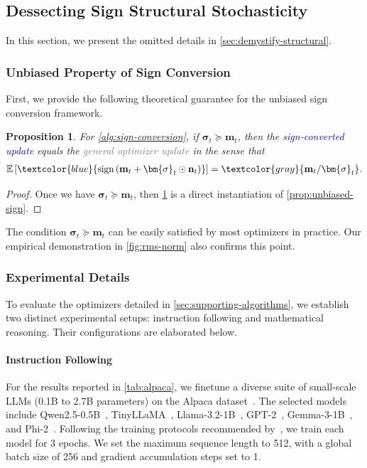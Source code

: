 \documentclass{article}
\newtheorem{prop}{Proposition}
\def \E {\mathbb{E}}
\def \m {\mathbf{m}}
\def \n {\mathbf{n}}
\DeclareMathOperator*{\sgn}{sign}
\newcommand{\sign}[1]{\sgn\left(#1\right)}
\def \bsigma {\bm{\sigma}}
\newcommand{\sqbrac}[1]{\left[#1\right]}
\begin{document}
\subsection{Dessecting Sign Structural Stochasticity\label{sec:dessect-sign-noise}}

In this section, we present the omitted details in \cref{sec:demystify-structural}. 

\subsubsection{Unbiased Property of Sign Conversion}

First, we provide the following theoretical guarantee for the unbiased sign conversion framework.

\begin{prop}\label{prop:unbiased-sign-conversion}
    For \cref{alg:sign-conversion}, if $\bsigma_t\succeq\m_t$, then the \textcolor{blue}{sign-converted update} equals the \textcolor{gray}{general optimizer update} in the sense that
    \begin{align*}
        \E\sqbrac{\textcolor{blue}{\sign{\m_t+\bsigma_t\odot\n_t}}}=\textcolor{gray}{\m_t/\bsigma_t}.
    \end{align*}
\end{prop}

\begin{proof}
    Once we have $\bsigma_t\succeq\m_t$, then \cref{prop:unbiased-sign-conversion} is a direct instantiation of \cref{prop:unbiased-sign}.
\end{proof}
The condition $\bsigma_t\succeq\m_t$ can be easily satisfied by most optimizers in practice. Our empirical demonstration in \cref{fig:rms-norm} also confirms this point.

\subsubsection{Experimental Details}

To evaluate the optimizers detailed in \cref{sec:supporting-algorithms}, we establish two distinct experimental setups: instruction following and mathematical reasoning. Their configurations are elaborated below.

\paragraph{Instruction Following} 
For the results reported in \cref{tab:alpaca}, we finetune a diverse suite of small-scale LLMs (0.1B to 2.7B parameters) on the Alpaca dataset~\citep{taori2023alpaca}. The selected models include Qwen2.5-0.5B~\citep{yang2024qwen2.5}, TinyLLaMA~\citep{zhang2024tinyllama}, Llama-3.2-1B~\citep{meta2024llama3.2_1b}, GPT-2~\citep{radford2019language}, Gemma-3-1B~\citep{kamath2025gemma3}, and Phi-2~\citep{javaheripi2023phi2}. Following the training protocols recommended by~\citet{taori2023alpaca,liu2025adagrad}, we train each model for 3 epochs. We set the maximum sequence length to 512, with a global batch size of 256 and gradient accumulation steps set to 1.
\end{document}
